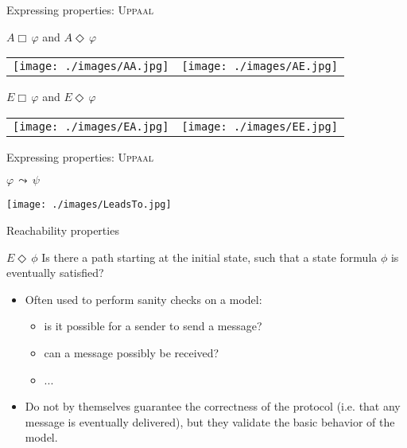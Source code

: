 \documentclass{beamer}
\def\dgold#1{{\darkgoldenrod #1}}
\def\dkb#1{{\blue #1}}
\begin{document}
\begin{slide}{Expressing properties: \textsc{Uppaal}}
\small

\begin{block}{$A \Box\, \varphi$ and $A \Diamond \, \varphi$}
\begin{tabular}{cc}
 \texttt{[image: ./images/AA.jpg]} &   \hspace{1cm} \texttt{[image: ./images/AE.jpg]}
\end{tabular}
\end{block}

\begin{block}{$E \Box\, \varphi$ and $E \Diamond\, \varphi$}
\begin{tabular}{cc}
 \texttt{[image: ./images/EA.jpg]} &   \hspace{1cm} \texttt{[image: ./images/EE.jpg]}
\end{tabular}
\end{block}
\end{slide}

\begin{slide}{Expressing properties: \textsc{Uppaal}}
\small

\begin{block}{$\varphi\, \leadsto\, \psi$}
\begin{center}
 \texttt{[image: ./images/LeadsTo.jpg]} 
 \end{center}
\end{block}

\end{slide}

\begin{slide}{Reachability properties}
\small

\begin{block}{$E \Diamond\, \phi$}
\dkb{Is there a path starting at the initial state, such that a state formula $\phi$ is eventually satisfied?}

\begin{itemize}
\item  Often used to perform sanity checks  on a model:
\begin{itemize}
\item \dgold{is it possible for a sender to send a message?}
 \item \dgold{can a message possibly be received?}
 \item ...
 \end{itemize}
 \item  Do not by themselves guarantee the correctness of the protocol (i.e. \dgold{that any message is eventually delivered}), 
but they validate the basic behavior of the model.
 \end{itemize}
\end{block}

\end{slide}
\end{document}
